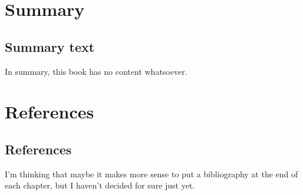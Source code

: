 \documentclass[
  letterpaper,
  DIV=11,
  numbers=noendperiod]{scrreprt}
\begin{document}
\begin{tcolorbox}

\chapter{Summary}\label{summary}

\section{Summary text}\label{summary-text}

In summary, this book has no content whatsoever.


\chapter*{References}\label{references}


\protect{}\label{refs}

\section*{References}\label{references-1}


I'm thinking that maybe it makes more sense to put a bibliography at the
end of each chapter, but I haven't decided for sure just yet.

\end{tcolorbox}
\end{document}
